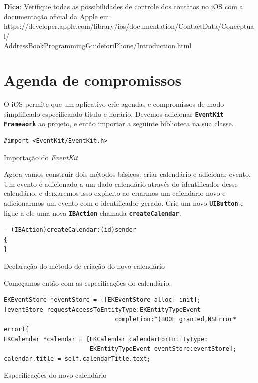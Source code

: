 \documentclass[a4paper,12pt,brazil,oneside]{book}
\begin{document}
\begin{framed}

\textbf{Dica}: Verifique todas as possibilidades de controle dos contatos no iOS com a documentação oficial da Apple em:\\ https://developer.apple.com/library/ios/documentation/ContactData/Conceptual/\\AddressBookProgrammingGuideforiPhone/Introduction.html
\end{framed}

\section{Agenda de compromissos}


O iOS permite que um aplicativo crie agendas e compromissos de modo simplificado especificando título e horário. Devemos adicionar \texttt{\textbf{EventKit Framework}} ao projeto, e então importar a seguinte biblioteca na sua classe.

\begin{listing}[H]
\begin{verbatim}
#import <EventKit/EventKit.h>
\end{verbatim}
\caption{Importação do \emph{EventKit}}
\end{listing}

Agora vamos construir dois métodos básicos: criar calendário e adicionar evento. Um evento é adicionado a um dado calendário através do identificador desse calendário, e deixaremos isso explicito ao criarmos um calendário novo e adicionarmos um evento com o identificador gerado. Crie um novo \texttt{\textbf{UIButton}} e ligue a ele uma nova \texttt{\textbf{IBAction}} chamada \texttt{\textbf{createCalendar}}.

\begin{listing}[H]
\begin{verbatim}
- (IBAction)createCalendar:(id)sender
{
}
\end{verbatim}
\caption{Declaração do método de criação do novo calendário}
\end{listing}

Começamos então com as especificações do calendário.

\begin{listing}[H]
\begin{verbatim}
EKEventStore *eventStore = [[EKEventStore alloc] init];
[eventStore requestAccessToEntityType:EKEntityTypeEvent
                               completion:^(BOOL granted,NSError* error){
EKCalendar *calendar = [EKCalendar calendarForEntityType:
						EKEntityTypeEvent eventStore:eventStore];
calendar.title = self.calendarTitle.text;
\end{verbatim}
\caption{Especificações do novo calendário}
\end{listing}
\end{document}
